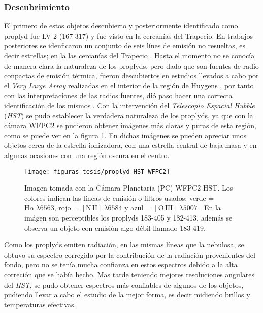 \documentclass{article}
\newcommand\ha{\ensuremath{\mathrm{H}\alpha}}
\newcommand\nii{\ensuremath{\mathrm{[N\,II]}}}
\newcommand\oiii{\ensuremath{\mathrm{[O\,III]}}}
\begin{document}
\subsubsection{ Descubrimiento}
\label{sec:descubrimiento-proplyds}

El primero de estos objetos descubierto y posteriormente identificado como proplyd fue LV 2 (167-317) y fue visto en la cercanías del Trapecio. En trabajos posteriores se idenficaron un conjunto de seis línes de emisión no resueltas, es decir estrellas; en la las cercanías del Trapecio \citep{Laques:1979}. Hasta el momento no se conocía de manera clara la naturaleza de los proplyds, pero dado que son fuentes de radio conpactas de emisión térmica, fueron descubiertos en estudios llevados a cabo por el \textit{Very Large Array} realizadas en el interior de la región de Huygens \citep{Garay:1987}, por tanto con las interpretaciones de las radios fuentes, dió paso  hacer una correcta identificación de los mismos \citep{Churchwell:1987}. Con la intervención del \textit{Telescopio Espacial Hubble} (\textit{HST}) se pudo establecer la verdadera naturaleza de los proplyds, ya que con la cámara WFPC2 \citep{Odell:1994} se pudieron obtener imágenes más claras y puras de esta región, como se puede ver en la figura \ref{fig:proplyd-hst}. En dichas imágenes se pueden apreciar unos objetos cerca de la estrella ionizadora, con una estrella central de baja masa y en algunas ocasiones con una región oscura en el centro.\\ 

\begin{figure}
  \centering
  \texttt{[image: figuras-tesis/proplyd-HST-WFPC2]}
  \caption{Imagen tomada con la Cámara Planetaria (PC) WFPC2-HST. Los colores indican las líneas de emisión o filtros usados;  verde = \(\ha~\lambda6563\), rojo =  \(\nii~\lambda6584\) y  azul = \(\oiii~\lambda5007\) \citep{Bally:1998a}. En la imágen son perceptibles los proplyds 183-405 y 182-413, además se observa un objeto con emisión algo débil llamado 183-419.}
  \label{fig:proplyd-hst}
\end{figure}
  

Como los proplyds emiten radiación, en las mismas líneas que la nebulosa, se obtuvo su espectro  corregido por la contribución de la radiación provenientes del fondo, pero no se tenía mucha confianza en estos espectros debido a la alta correción que se había hecho. Mas tarde teniendo mejores resoluciones angulares del \textit{HST}, se pudo obtener espectros más confiables de algunos de los objetos, pudiendo llevar a cabo el estudio de la mejor forma, es decir midiendo brillos y temperaturas efectivas.\\
\end{document}
